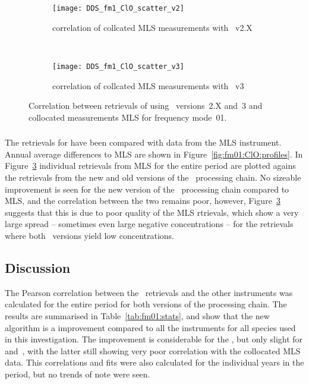 \begin{figure}[htpb]
    \centering
    \begin{subfigure}[b]{0.49\textwidth}
        \texttt{[image: DDS\_fm1\_ClO\_scatter\_v2]}
        \caption{correlation of collcated MLS measurements with \smr~v2.X}
        \label{fig:fm01:ClO:scatter:v2}
    \end{subfigure}
    \,
    \begin{subfigure}[b]{0.49\textwidth}
        \texttt{[image: DDS\_fm1\_ClO\_scatter\_v3]}
        \caption{correlation of collcated MLS measurements with \smr~v3}
        \label{fig:fm01:ClO:scatter:v3}
    \end{subfigure}
    \caption{Correlation between retrievals of  using \smr\
    versions~2.X and~3 and collocated measurements MLS for frequency mode~01.}
    \label{fig:fm01:ClO:scatter}
\end{figure}

\subsubsection{}
\label{sec:fm01:comparison:ClO}
The retrievals for \chem{ClO} have been compared with data from the MLS
instrument. Annual average differences to MLS are shown in
Figure~\ref{fig:fm01:ClO:profiles}. In Figure~\ref{fig:fm01:ClO:scatter}
individual retrievals from MLS for the entire period are plotted agains the
retrievals from the new and old versions of the \smr\ processing chain. No
sizeable improvement is seen for the new version of the \smr\ processing chain
compared to MLS, and the correlation between the two remains poor, however,
Figure~\ref{fig:fm01:ClO:scatter} suggests that this is due to poor quality of
the MLS rtrievals, which show a very large spread -- sometimes even large
negative concentrations -- for the retrievals where both \smr\ versions yield
low \chem{ClO} concentrations.



\subsubsection{}
\label{sec:fm01:comparison:temperature}


\subsection{Discussion}
\label{sec:fm01:discussion}
The Pearson correlation between the \smr\ retrievals and the other instruments
was calculated for the entire period for both versions of the processing chain.
The results are summarised in Table~\ref{tab:fm01:stats}, and show that the
new algorithm is a improvement compared to all the instruments for all species
used in this investigation. The improvement is considerable for the \chem{O_3},
but only slight for \chem{N_2O} and~\chem{ClO}, with the latter still showing
very poor correlation with the collocated MLS data. This correlations and fits
were also calculated for the individual years in the period, but no trends of
note were seen.


